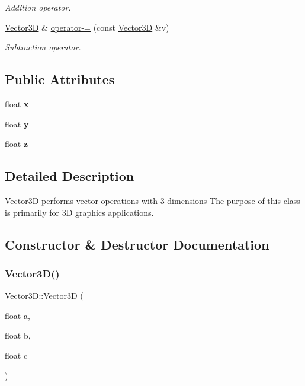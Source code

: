 \begin{DoxyCompactItemize}
\begin{DoxyCompactList}\small\item\em Addition operator. \end{DoxyCompactList}\item 
\mbox{\label{structVector3D_a659cecf32e155fa6b6d97344a562df4d}} 
\hyperlink{structVector3D}{Vector3D} \& \hyperlink{structVector3D_a659cecf32e155fa6b6d97344a562df4d}{operator-\/=} (const \hyperlink{structVector3D}{Vector3D} \&v)
\begin{DoxyCompactList}\small\item\em Subtraction operator. \end{DoxyCompactList}\end{DoxyCompactItemize}
\subsection*{Public Attributes}
\begin{DoxyCompactItemize}
\item 
\mbox{\label{structVector3D_aca5d15bdb846448e3cb73b072783f329}} 
float {\bfseries x}
\item 
\mbox{\label{structVector3D_a9b6d194fcf526d7d4f9e902421285e94}} 
float {\bfseries y}
\item 
\mbox{\label{structVector3D_af9728f1eba23b9ee091755346214f391}} 
float {\bfseries z}
\end{DoxyCompactItemize}


\subsection{Detailed Description}
\hyperlink{structVector3D}{Vector3D} performs vector operations with 3-\/dimensions The purpose of this class is primarily for 3D graphics applications. 

\subsection{Constructor \& Destructor Documentation}
\mbox{\label{structVector3D_a7b0f18fa43c7a90588dedcd814122359}} 
\subsubsection{\texorpdfstring{Vector3\+D()}{Vector3D()}}
{\footnotesize\ttfamily Vector3\+D\+::\+Vector3D (\begin{DoxyParamCaption}\item[{float}]{a,  }\item[{float}]{b,  }\item[{float}]{c }\end{DoxyParamCaption})\hspace{0.3cm}{\ttfamily [inline]}}

